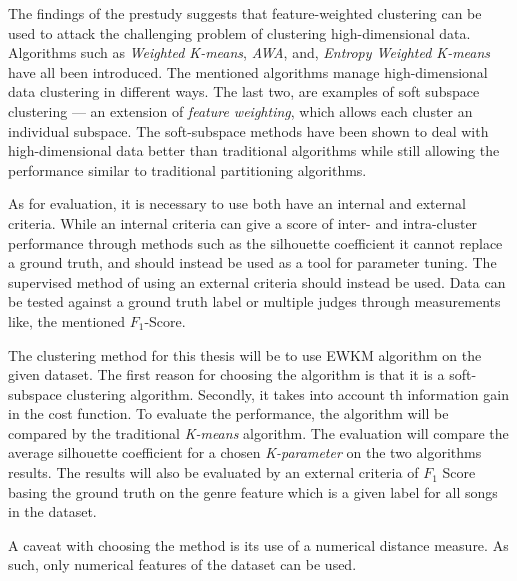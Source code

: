 \documentclass[../report.tex]{subfiles}
\begin{document}
The findings of the prestudy suggests that feature-weighted clustering can be used to attack the challenging problem of clustering high-dimensional data. Algorithms such as \textit{Weighted K-means}, \textit{AWA}, and, \textit{Entropy Weighted K-means} have all been introduced.  The mentioned algorithms manage high-dimensional data clustering in different ways. The last two, are examples of soft subspace clustering --- an extension of \textit{feature weighting}, which allows each cluster an individual subspace. The soft-subspace methods have been shown to deal with high-dimensional data better than traditional algorithms while still allowing the performance similar to traditional partitioning algorithms.

As for evaluation, it is necessary to use both have an internal and external criteria. While an internal criteria can give a score of inter- and intra-cluster performance through methods such as the silhouette coefficient it cannot replace a ground truth, and should instead be used as a tool for parameter tuning. The supervised method of using an external criteria should instead be used. Data can be tested against a ground truth label or multiple judges through measurements like, the mentioned $F_1$-Score.

The clustering method for this thesis will be to use EWKM algorithm on the given dataset. The first reason for choosing the algorithm is that it is a soft-subspace clustering algorithm. Secondly, it takes into account th information gain in the cost function. To evaluate the performance, the algorithm will be compared by the traditional \textit{K-means} algorithm. The evaluation will compare the average silhouette coefficient for a chosen \textit{K-parameter} on the two algorithms results. The results will also be evaluated by an external criteria of $F_1$ Score basing the ground truth on the genre feature which is a given label for all songs in the dataset.

A caveat with choosing the method is its use of a numerical distance measure. As such, only numerical features of the dataset can be used.

\end{document}
